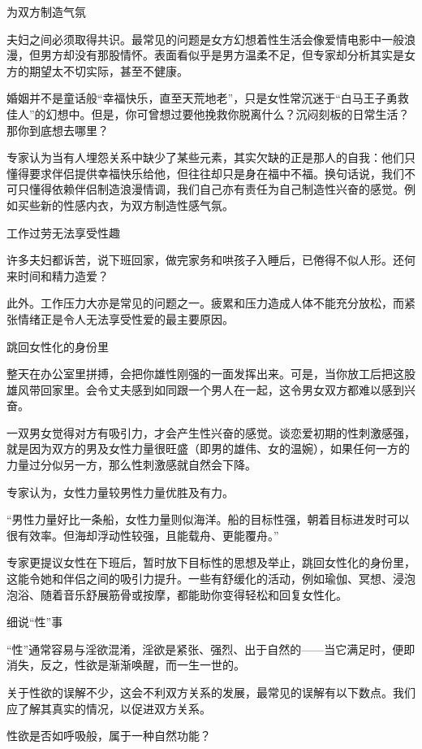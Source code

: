 \documentclass[12pt,UTF8]{ctexbook}
\begin{document}
为双方制造气氛

夫妇之间必须取得共识。最常见的问题是女方幻想着性生活会像爱情电影中一般浪漫，但男方却没有那股情怀。表面看似乎是男方温柔不足，但专家却分析其实是女方的期望太不切实际，甚至不健康。

婚姻并不是童话般“幸福快乐，直至天荒地老”，只是女性常沉迷于“白马王子勇救佳人”的幻想中。但是，你可曾想过要他挽救你脱离什么？沉闷刻板的日常生活？那你到底想去哪里？

专家认为当有人埋怨关系中缺少了某些元素，其实欠缺的正是那人的自我：他们只懂得要求伴侣提供幸福快乐给他，但往往却只是身在福中不福。换句话说，我们不可只懂得依赖伴侣制造浪漫情调，我们自己亦有责任为自己制造性兴奋的感觉。例如买些新的性感内衣，为双方制造性感气氛。

工作过劳无法享受性趣

许多夫妇都诉苦，说下班回家，做完家务和哄孩子入睡后，已倦得不似人形。还何来时间和精力造爱？

此外。工作压力大亦是常见的问题之一。疲累和压力造成人体不能充分放松，而紧张情绪正是令人无法享受性爱的最主要原因。

跳回女性化的身份里

整天在办公室里拼搏，会把你雄性刚强的一面发挥出来。可是，当你放工后把这股雄风带回家里。会令丈夫感到如同跟一个男人在一起，这令男女双方都难以感到兴奋。

一双男女觉得对方有吸引力，才会产生性兴奋的感觉。谈恋爱初期的性刺激感强，就是因为双方的男及女性力量很旺盛（即男的雄伟、女的温婉），如果任何一方的力量过分似另一方，那么性刺激感就自然会下降。

专家认为，女性力量较男性力量优胜及有力。

“男性力量好比一条船，女性力量则似海洋。船的目标性强，朝着目标进发时可以很有效率。但海却浮动性较强，且能载舟、更能覆舟。”

专家更提议女性在下班后，暂时放下目标性的思想及举止，跳回女性化的身份里，这能令她和伴侣之间的吸引力提升。一些有舒缓化的活动，例如瑜伽、冥想、浸泡泡浴、随着音乐舒展筋骨或按摩，都能助你变得轻松和回复女性化。





细说“性”事


“性”通常容易与淫欲混淆，淫欲是紧张、强烈、出于自然的——当它满足时，便即消失，反之，性欲是渐渐唤醒，而一生一世的。

关于性欲的误解不少，这会不利双方关系的发展，最常见的误解有以下数点。我们应了解其真实的情况，以促进双方关系。

性欲是否如呼吸般，属于一种自然功能？
\end{document}
